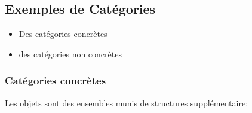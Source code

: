 \documentclass[../main.tex]{subfiles}
\begin{document}
\subsection{Exemples de Catégories}

\begin{exemple}
\begin{itemize}
\item Des catégories concrètes
\item des catégories non concrètes
\end{itemize}

\end{exemple}
\subsubsection{Catégories concrètes}
Les objets sont des ensembles munis de structures supplémentaire:
\end{document}
